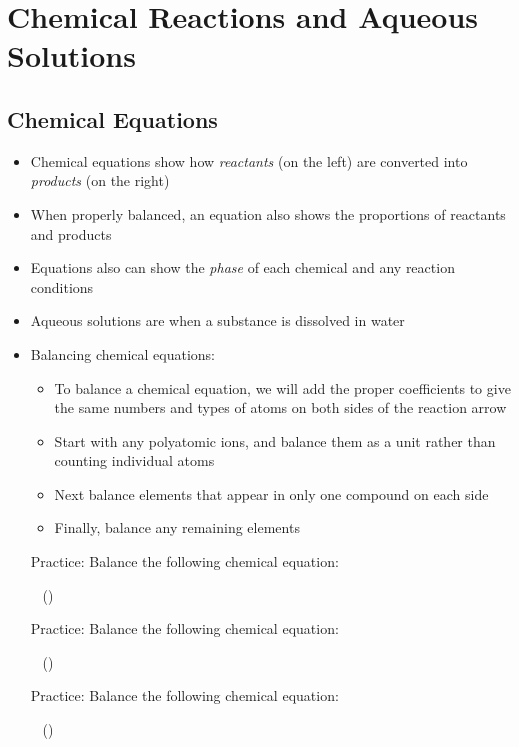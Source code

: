 \documentclass[12pt, openany, letterpaper]{memoir}
\begin{document}
\chapter{Chemical Reactions and Aqueous Solutions}
\section{Chemical Equations}
\begin{itemize}
	\item Chemical equations show how \emph{reactants} (on the left) are converted into \emph{products} (on the right)
	\item When properly balanced, an equation also shows the proportions of reactants and products
	\item Equations also can show the \emph{phase} of each chemical and any reaction conditions
	\item Aqueous solutions are when a substance is dissolved in water
	\item Balancing chemical equations:
	      \begin{itemize}
		      \item To balance a chemical equation, we will add the proper coefficients to give the same numbers and types of atoms on both sides of the reaction arrow
		      \item Start with any polyatomic ions, and balance them as a unit rather than counting individual atoms
		      \item Next balance elements that appear in only one compound on each side
		      \item Finally, balance any remaining elements
	      \end{itemize}

	      Practice: Balance the following chemical equation: 

	      ~\hphantom{Practice:} ()

	      Practice: Balance the following chemical equation: 

	      ~\hphantom{Practice:} ()

	      Practice: Balance the following chemical equation: 

	      ~\hphantom{Practice:} ()
\end{itemize}
\end{document}
